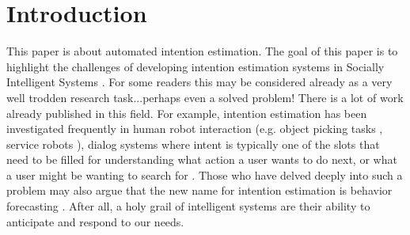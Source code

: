 \documentclass[sigconf]{acmart}
\begin{document}

\maketitle

\section{Introduction}
This paper is about automated intention estimation. The goal of this paper is to highlight the challenges of developing intention estimation systems in Socially Intelligent Systems \cite{akata2020research,Vinciarellietalicv2009,picard2000affective}. For some readers this may be considered already as a very well trodden research task...perhaps even a solved problem! There is a lot of work already published in this field. For example, intention estimation has been investigated frequently in human robot interaction (e.g. object picking tasks \cite{Huang2015,objectpicking2021,10.1007/s11263-018-1104-4}, service robots \cite{ABBATE2024104568}), dialog systems where intent is typically one of the slots that need to be filled for understanding what action a user wants to do next, or what a user might be wanting to search for \cite{IntentMMSearch}. Those who have delved deeply into such a problem may also argue that the new name for intention estimation is behavior forecasting \cite{humantrajpredict2020,ramansocproc2021}. After all, a holy grail of intelligent systems are their ability to anticipate and respond to our needs. 
\end{document}
